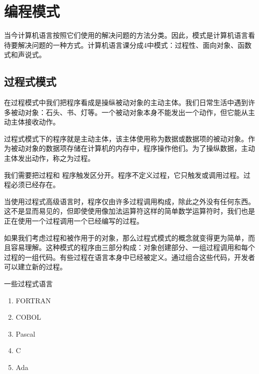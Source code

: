 \section{编程模式}
当今计算机语言按照它们使用的解决问题的方法分类。因此，模式是计算机语言看待要解决问题的一种方式。计算机语言课分成4中模式：过程性、面向对象、函数式和声说式。
\subsection{过程式模式}
在过程模式中我们把程序看成是操纵被动对象的主动主体。我们日常生活中遇到许多被动对象：石头、书、灯等。一个被动对象本身不能发出一个动作，但它能从主动主体接收动作。

过程式模式下的程序就是主动主体，该主体使用称为数据或数据项的被动对象。作为被动对象的数据项存储在计算机的内存中，程序操作他们。为了操纵数据，主动主体发出动作，称之为过程。

我们需要把过程和 程序触发区分开。程序不定义过程，它只触发或调用过程。过程必须已经存在。

当使用过程式高级语言时，程序仅由许多过程调用构成，除此之外没有任何东西。这不是显而易见的，但即使使用像加法运算符这样的简单数学运算符时，我们也是正在使用一个过程调用一个已经编写的过程。

如果我们考虑过程和被作用于的对象，那么过程式模式的概念就变得更为简单，而且容易理解。这种模式的程序由三部分构成：对象创建部分、一组过程调用和每个过程的一组代码。有些过程在语言本身中已经被定义。通过组合这些代码，开发者可以建立新的过程。

一些过程式语言
\begin{enumerate}
	\item FORTRAN
	\item COBOL
	\item Pascal
	\item C
	\item Ada
\end{enumerate}
